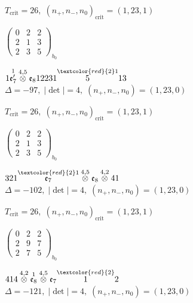 \documentclass[10pt]{article}
\begin{document}
\hspace{1em}$T_{\text{crit}}=26,\; (n_+,n_-,n_0)_{\text{crit}}=(1,23,1)$

\hspace{2em}$\left(\begin{smallmatrix}0 & 2 & 2 \\ 2 & 1 & 3 \\ 2 & 3 & 5\end{smallmatrix}\right)_{\!b_0}$

\smallskip

$1\overset{1}{\mathfrak{e}_7'}\overset{4,5}{\otimes}\mathfrak{e}_812231\overset{\textcolor{red}{2}1}{5}13$ \quad $\Delta=-97,\; |\det|=4,\; (n_+,n_-,n_0)=(1,23,0)$

\hspace{1em}$T_{\text{crit}}=26,\; (n_+,n_-,n_0)_{\text{crit}}=(1,23,1)$

\hspace{2em}$\left(\begin{smallmatrix}0 & 2 & 2 \\ 2 & 1 & 3 \\ 2 & 3 & 5\end{smallmatrix}\right)_{\!b_0}$

\smallskip

$321\overset{\textcolor{red}{2}1}{\mathfrak{e}_7}\overset{4,5}{\otimes}\mathfrak{e}_8\overset{4,2}{\otimes}41$ \quad $\Delta=-102,\; |\det|=4,\; (n_+,n_-,n_0)=(1,23,0)$

\hspace{1em}$T_{\text{crit}}=26,\; (n_+,n_-,n_0)_{\text{crit}}=(1,23,1)$

\hspace{2em}$\left(\begin{smallmatrix}0 & 2 & 2 \\ 2 & 9 & 7 \\ 2 & 7 & 5\end{smallmatrix}\right)_{\!b_0}$

\smallskip

$414\overset{4,2}{\otimes}\overset{1}{\mathfrak{e}_8}\overset{4,5}{\otimes}\mathfrak{e}_7\overset{\textcolor{red}{2}}{1}2$ \quad $\Delta=-121,\; |\det|=4,\; (n_+,n_-,n_0)=(1,23,0)$
\end{document}
